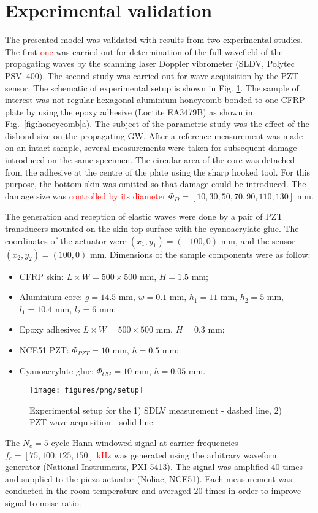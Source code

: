 \documentclass[sensors,article,submit,moreauthors,pdftex]{Definitions/mdpi}
\begin{document}
\section{Experimental validation}
The presented model was validated with results from two
experimental studies.
The first \textcolor{red}{one} was carried out for determination of the full wavefield of the propagating waves by the scanning laser Doppler vibrometer (SLDV, Polytec PSV–400).
The second study was carried out for wave acquisition by the PZT sensor.
The schematic of experimental setup is shown in Fig. \ref{fig:setup}.
The sample of interest was not-regular hexagonal aluminium honeycomb bonded to one CFRP plate by using the epoxy adhesive (Loctite EA3479B) as shown in Fig.~\ref{fig:honeycomb}a).
The subject of the parametric study was the effect of the disbond size on the propagating GW.
After a reference measurement was made on an intact sample, several measurements were taken for subsequent damage introduced on the same specimen.
The circular area of the core was detached from the adhesive at the centre of the plate using the sharp hooked tool.
For this purpose, the bottom skin was omitted so that damage could be introduced.
The damage size was \textcolor{red}{controlled by its diameter} \(\Phi_D=\left [10, 30, 50, 70, 90, 110, 130 \right ]\) mm.

The generation and reception of elastic waves were done by a pair of PZT transducers mounted on the skin top surface with the cyanoacrylate glue.
The coordinates of the actuator were \((x_1,y_1)=(-100,0)\) mm,	and the sensor \((x_2,y_2)=(100,0)\) mm.
Dimensions of the sample components were as follow:
\begin{itemize}
	\color{red}
	\item CFRP skin: \(L \times W = 500 \times 500\) mm, \(H = 1.5\) mm;
	\item Aluminium core: \(g=14.5\) mm, \(w=0.1\) mm, \(h_1=11\) mm, \(h_2=5\) mm, \(l_1=10.4\) mm, \(l_2=6\) mm;
	\item Epoxy adhesive: \(L\times W=500 \times 500\) mm, \(H=0.3 \) mm;
	\item NCE51 PZT: \(\Phi_{PZT}=10\) mm, \(h=0.5\) mm;
	\item Cyanoacrylate glue: \(\Phi_{CG}=10\) mm, \(h=0.05\) mm.
\end{itemize}

\begin{figure}
	\begin{center}
		\texttt{[image: figures/png/setup]}
	\end{center}
	\caption{Experimental setup for the 1) SDLV measurement - dashed line, 2) PZT wave acquisition - solid line.}
	\label{fig:setup}
\end{figure}
The \(N_c=5\) cycle Hann windowed signal at carrier frequencies \(f_c=[75,100,125,150]\) \textcolor{red}{kHz} was generated using the arbitrary waveform generator (National Instruments, PXI 5413).
The signal was amplified 40 times and supplied to the piezo actuator (Noliac, NCE51).
Each measurement was conducted in the room temperature and averaged 20 times in order to improve signal to noise ratio.
\end{document}

